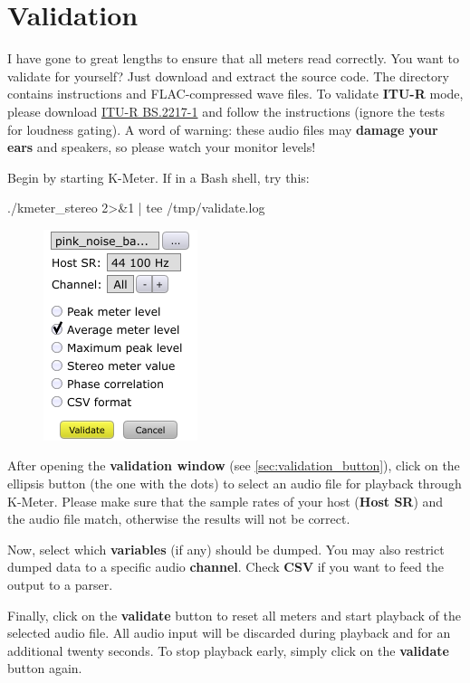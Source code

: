 \chapter{Validation}
\label{chap:validation}

I have gone to great lengths to ensure that all meters read correctly.
You want to validate for yourself?  Just download and extract the
source code.  The directory  contains instructions
and FLAC-compressed wave files.  To validate \textbf{ITU-R} mode,
please download \href{http://www.itu.int/pub/R-REP-BS.2217}{ITU-R
  BS.2217-1} and follow the instructions (ignore the tests for
loudness gating).  A word of warning: these audio files may
\textbf{damage your ears} and speakers, so please watch your monitor
levels!

Begin by starting K-Meter.  If in a Bash shell, try this:

\begin{VerbatimBoth}
  ./kmeter_stereo 2>&1 | tee /tmp/validate.log
\end{VerbatimBoth}

\begin{figure}
\includegraphics[scale=0.50,clip]{include/images/dialog_validation.png}
\end{figure}

After opening the \textbf{validation window} (see
\ref{sec:validation_button}), click on the ellipsis button (the one
with the dots) to select an audio file for playback through K-Meter.
Please make sure that the sample rates of your host (\textbf{Host SR})
and the audio file match, otherwise the results will not be correct.

Now, select which \textbf{variables} (if any) should be dumped.  You
may also restrict dumped data to a specific audio \textbf{channel}.
Check \textbf{CSV} if you want to feed the output to a parser.

Finally, click on the \textbf{validate} button to reset all meters and
start playback of the selected audio file.  All audio input will be
discarded during playback and for an additional twenty seconds.  To
stop playback early, simply click on the \textbf{validate} button
again.

